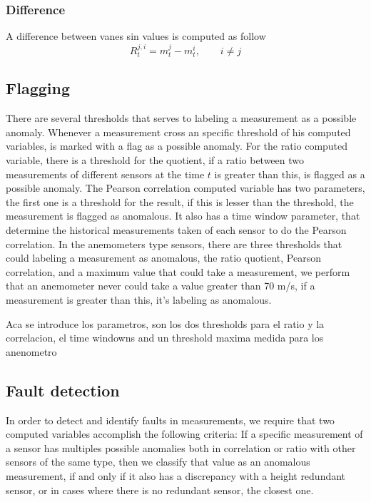 \documentclass[journal]{IEEEtran}
\begin{document}
\subsubsection{Difference}
A difference between vanes sin values is computed as follow
\begin{equation}
R_{t}^{j,i} = {m_{t}^{j} - m_{t}^{i}},\qquad i \neq j 
\end{equation} 


\subsection{Flagging}\label{subsec:flagging}
There are several thresholds that serves to labeling a measurement as a possible anomaly. Whenever a measurement cross an specific threshold of his computed variables, is marked with a flag as a possible anomaly. 
For the ratio computed variable, there is a threshold for the quotient, if a ratio between two measurements of different sensors at the time $t$ is greater than this, is flagged as a possible anomaly. 
The Pearson correlation computed variable has two parameters, the first one is a threshold for the result, if this is lesser than the threshold, the measurement is flagged as anomalous. It also has a time window parameter, that determine the historical measurements taken of each sensor to do the Pearson correlation.
In the anemometers type sensors, there are three thresholds that could labeling a measurement as anomalous, the ratio quotient, Pearson correlation, and a maximum value that could take a measurement, we perform that an anemometer never could take a value greater than 70 m/s, if a measurement is greater than this, it's labeling as anomalous.

Aca se introduce los parametros, son los dos thresholds para el ratio y la correlacion, el time windowns and un threshold maxima medida para los anenometro


\subsection{Fault detection}\label{subsec:faultdetection}
In order to detect and identify faults in measurements, we require that two computed variables accomplish the following criteria: If a specific measurement of a sensor has multiples possible anomalies both in correlation or ratio with other sensors of the same type, then we classify that value as an anomalous measurement, if and only if it also has a discrepancy with a height redundant sensor, or in cases where there is no redundant sensor, the closest one.
\end{document}
